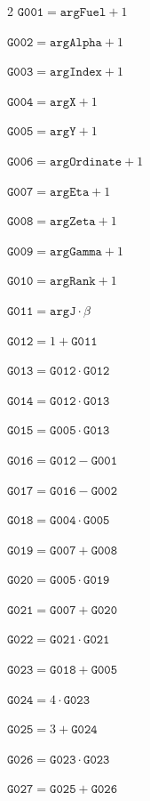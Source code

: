 \documentclass[10pt]{article}
\begin{document}
\begin{multicols}{2}\fontsize{8}{9}\selectfont
\noindent $\mathtt{G001}=\mathtt{argFuel}+1$\par
\noindent $\mathtt{G002}=\mathtt{argAlpha}+1$\par
\noindent $\mathtt{G003}=\mathtt{argIndex}+1$\par
\noindent $\mathtt{G004}=\mathtt{argX}+1$\par
\noindent $\mathtt{G005}=\mathtt{argY}+1$\par
\noindent $\mathtt{G006}=\mathtt{argOrdinate}+1$\par
\noindent $\mathtt{G007}=\mathtt{argEta}+1$\par
\noindent $\mathtt{G008}=\mathtt{argZeta}+1$\par
\noindent $\mathtt{G009}=\mathtt{argGamma}+1$\par
\noindent $\mathtt{G010}=\mathtt{argRank}+1$\par
\noindent $\mathtt{G011}=\mathtt{argJ}\cdot \beta$\par
\noindent $\mathtt{G012}=1+\mathtt{G011}$\par
\noindent $\mathtt{G013}=\mathtt{G012}\cdot \mathtt{G012}$\par
\noindent $\mathtt{G014}=\mathtt{G012}\cdot \mathtt{G013}$\par
\noindent $\mathtt{G015}=\mathtt{G005}\cdot \mathtt{G013}$\par
\noindent $\mathtt{G016}=\mathtt{G012}-\mathtt{G001}$\par
\noindent $\mathtt{G017}=\mathtt{G016}-\mathtt{G002}$\par
\noindent $\mathtt{G018}=\mathtt{G004}\cdot \mathtt{G005}$\par
\noindent $\mathtt{G019}=\mathtt{G007}+\mathtt{G008}$\par
\noindent $\mathtt{G020}=\mathtt{G005}\cdot \mathtt{G019}$\par
\noindent $\mathtt{G021}=\mathtt{G007}+\mathtt{G020}$\par
\noindent $\mathtt{G022}=\mathtt{G021}\cdot \mathtt{G021}$\par
\noindent $\mathtt{G023}=\mathtt{G018}+\mathtt{G005}$\par
\noindent $\mathtt{G024}=4\cdot \mathtt{G023}$\par
\noindent $\mathtt{G025}=3+\mathtt{G024}$\par
\noindent $\mathtt{G026}=\mathtt{G023}\cdot \mathtt{G023}$\par
\noindent $\mathtt{G027}=\mathtt{G025}+\mathtt{G026}$\par

\end{multicols}
\end{document}
